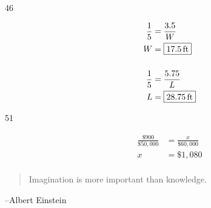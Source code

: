 \documentclass[letterpaper, landscape]{exam}
\begin{document}
\begin{description}
      \item[46]
        \begin{align*}
          \frac{1}{5} & = \frac{3.5}{W} \\
          W           & = \boxed{ \unit[17.5]{ft} } \\
          \\
          \frac{1}{5} & = \frac{5.75}{L} \\
          L           & = \boxed{ \unit[28.75]{ft} } \\
        \end{align*}

      \item[51]
        \begin{align*}
          \frac{\$900}{\$50,000} & = \frac{x}{\$60,000} \\
          x                      & = \boxed{ \$1,080 } \\
        \end{align*}

    \end{description}

  \fi
  \ifprintanswers{}
  \else
    \vspace{9 cm}
    \begin{quote}
      \begin{em}
        Imagination is more important than knowledge.
      \end{em}
    \end{quote}
    \hspace{2 cm}--Albert Einstein
  \fi
\end{document}
